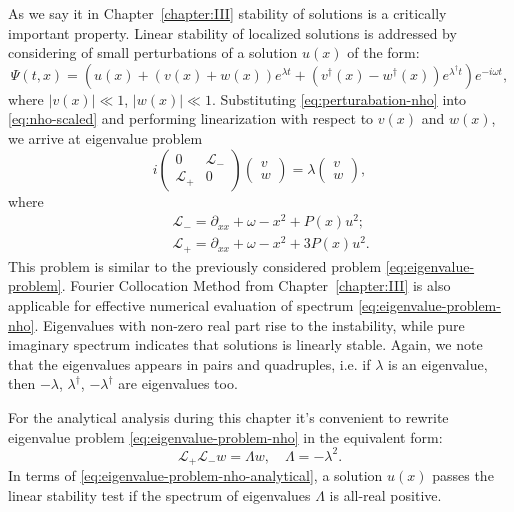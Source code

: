 As we say it in Chapter~\ref{chapter:III} stability of solutions is a critically important property.
Linear stability of localized solutions is addressed by considering of small perturbations of a solution $u(x)$ of the form:
\begin{equation}
	\Psi(t, x) = \left( u(x) + (v(x) + w(x)) e^{\lambda t} + (v^{\dagger}(x) - w^{\dagger}(x)) e^{\lambda^{\dagger} t} \right) e^{-i \omega t},
\label{eq:perturabation-nho}
\end{equation}
where $|v(x)| \ll 1$, $|w(x)| \ll 1$.
Substituting \eqref{eq:perturabation-nho} into \eqref{eq:nho-scaled} and performing linearization with respect to $v(x)$ and $w(x)$, we arrive at eigenvalue problem
\begin{equation}
	i
	\begin{pmatrix}
		0 & \mathcal{L}_- \\
		\mathcal{L}_+ & 0
	\end{pmatrix}
	\begin{pmatrix}
		v \\ w
	\end{pmatrix} =
	\lambda
	\begin{pmatrix}
		v \\ w	
	\end{pmatrix},
\label{eq:eigenvalue-problem-nho}
\end{equation}
where 
\begin{eqnarray*}
	&& \mathcal{L}_- = \partial_{xx} + \omega -x^2 + P(x) u^2; \\
	&& \mathcal{L}_+ = \partial_{xx} + \omega -x^2 + 3 P(x) u^2.
\end{eqnarray*}
This problem is similar to the previously considered problem \eqref{eq:eigenvalue-problem}.
Fourier Collocation Method from Chapter~\ref{chapter:III} is also applicable for effective numerical evaluation of spectrum \eqref{eq:eigenvalue-problem-nho}.
Eigenvalues with non-zero real part rise to the instability, while pure imaginary spectrum indicates that solutions is linearly stable.
Again, we note that the eigenvalues appears in pairs and quadruples, i.e. if $\lambda$ is an eigenvalue, then $-\lambda$, $\lambda^{\dagger}$, $-\lambda^{\dagger}$ are eigenvalues too.

For the analytical analysis during this chapter it's convenient to rewrite eigenvalue problem \eqref{eq:eigenvalue-problem-nho} in the equivalent form:
\begin{equation}
	\mathcal{L}_+ \mathcal{L}_- w = \Lambda w, \quad \Lambda = -\lambda^2.
\label{eq:eigenvalue-problem-nho-analytical}
\end{equation}
In terms of \eqref{eq:eigenvalue-problem-nho-analytical}, a solution $u(x)$ passes the linear stability test if the spectrum of eigenvalues $\Lambda$ is all-real positive.

